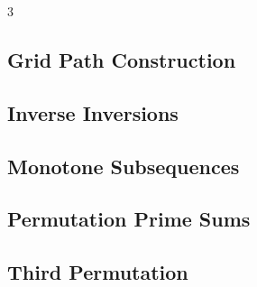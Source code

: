 \documentclass[8pt]{extarticle}
\begin{document}
\begin{multicols*}{3}
\subsection{Grid Path Construction}
\begin{caixaenunciado}

\end{caixaenunciado}
\vspace{0.3cm}


\subsection{Inverse Inversions}
\begin{caixaenunciado}

\end{caixaenunciado}
\vspace{0.3cm}


\subsection{Monotone Subsequences}
\begin{caixaenunciado}

\end{caixaenunciado}
\vspace{0.3cm}


\subsection{Permutation Prime Sums}
\begin{caixaenunciado}

\end{caixaenunciado}
\vspace{0.3cm}


\subsection{Third Permutation}
\begin{caixaenunciado}

\end{caixaenunciado}
\vspace{0.3cm}

\end{multicols*}
\end{document}
